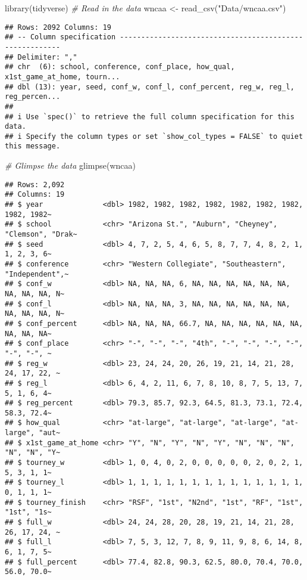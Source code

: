 \documentclass[
]{article}
\newenvironment{Shaded}{\begin{snugshade}}{\end{snugshade}}
\newcommand{\CommentTok}[1]{\textcolor[rgb]{0.56,0.35,0.01}{\textit{#1}}}
\newcommand{\FunctionTok}[1]{\textcolor[rgb]{0.00,0.00,0.00}{#1}}
\newcommand{\NormalTok}[1]{#1}
\newcommand{\OtherTok}[1]{\textcolor[rgb]{0.56,0.35,0.01}{#1}}
\newcommand{\StringTok}[1]{\textcolor[rgb]{0.31,0.60,0.02}{#1}}
\begin{document}
\begin{Shaded}
\begin{Highlighting}[]
\FunctionTok{library}\NormalTok{(tidyverse)}
\CommentTok{\# Read in the data }
\NormalTok{wncaa }\OtherTok{\textless{}{-}} \FunctionTok{read\_csv}\NormalTok{(}\StringTok{"Data/wncaa.csv"}\NormalTok{)}
\end{Highlighting}
\end{Shaded}

\begin{verbatim}
## Rows: 2092 Columns: 19
## -- Column specification --------------------------------------------------------
## Delimiter: ","
## chr  (6): school, conference, conf_place, how_qual, x1st_game_at_home, tourn...
## dbl (13): year, seed, conf_w, conf_l, conf_percent, reg_w, reg_l, reg_percen...
## 
## i Use `spec()` to retrieve the full column specification for this data.
## i Specify the column types or set `show_col_types = FALSE` to quiet this message.
\end{verbatim}

\begin{Shaded}
\begin{Highlighting}[]
\CommentTok{\# Glimpse the data }
\FunctionTok{glimpse}\NormalTok{(wncaa)}
\end{Highlighting}
\end{Shaded}

\begin{verbatim}
## Rows: 2,092
## Columns: 19
## $ year              <dbl> 1982, 1982, 1982, 1982, 1982, 1982, 1982, 1982, 1982~
## $ school            <chr> "Arizona St.", "Auburn", "Cheyney", "Clemson", "Drak~
## $ seed              <dbl> 4, 7, 2, 5, 4, 6, 5, 8, 7, 7, 4, 8, 2, 1, 1, 2, 3, 6~
## $ conference        <chr> "Western Collegiate", "Southeastern", "Independent",~
## $ conf_w            <dbl> NA, NA, NA, 6, NA, NA, NA, NA, NA, NA, NA, NA, NA, N~
## $ conf_l            <dbl> NA, NA, NA, 3, NA, NA, NA, NA, NA, NA, NA, NA, NA, N~
## $ conf_percent      <dbl> NA, NA, NA, 66.7, NA, NA, NA, NA, NA, NA, NA, NA, NA~
## $ conf_place        <chr> "-", "-", "-", "4th", "-", "-", "-", "-", "-", "-", ~
## $ reg_w             <dbl> 23, 24, 24, 20, 26, 19, 21, 14, 21, 28, 24, 17, 22, ~
## $ reg_l             <dbl> 6, 4, 2, 11, 6, 7, 8, 10, 8, 7, 5, 13, 7, 5, 1, 6, 4~
## $ reg_percent       <dbl> 79.3, 85.7, 92.3, 64.5, 81.3, 73.1, 72.4, 58.3, 72.4~
## $ how_qual          <chr> "at-large", "at-large", "at-large", "at-large", "aut~
## $ x1st_game_at_home <chr> "Y", "N", "Y", "N", "Y", "N", "N", "N", "N", "N", "Y~
## $ tourney_w         <dbl> 1, 0, 4, 0, 2, 0, 0, 0, 0, 0, 2, 0, 2, 1, 5, 3, 1, 1~
## $ tourney_l         <dbl> 1, 1, 1, 1, 1, 1, 1, 1, 1, 1, 1, 1, 1, 1, 0, 1, 1, 1~
## $ tourney_finish    <chr> "RSF", "1st", "N2nd", "1st", "RF", "1st", "1st", "1s~
## $ full_w            <dbl> 24, 24, 28, 20, 28, 19, 21, 14, 21, 28, 26, 17, 24, ~
## $ full_l            <dbl> 7, 5, 3, 12, 7, 8, 9, 11, 9, 8, 6, 14, 8, 6, 1, 7, 5~
## $ full_percent      <dbl> 77.4, 82.8, 90.3, 62.5, 80.0, 70.4, 70.0, 56.0, 70.0~
\end{verbatim}
\end{document}

